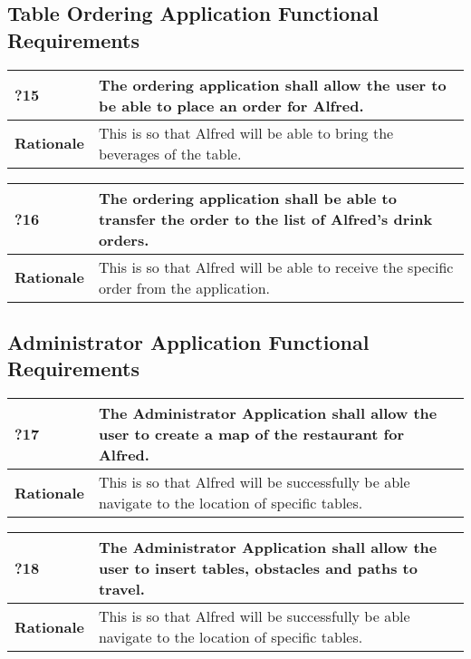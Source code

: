 \documentclass [11pt]{article}
\begin{document}
\subsection{Table Ordering Application Functional Requirements}

\begin{longtable}{| p{ } | p{ } | }\hline 
	\rowcolor{tableCell}\textbf{?15} & The ordering application shall allow the user to be able to place an order for Alfred. \\ \hline
	\textbf{Rationale} &  This is so that Alfred will be able to bring the beverages of the table.\\ \hline 
\end{longtable}


\begin{longtable}{| p{ } | p{ } | }\hline 
	\rowcolor{tableCell}\textbf{?16} & The ordering application shall be able to transfer the order to the list of Alfred's drink orders. \\ \hline
	\textbf{Rationale} &  This is so that Alfred will be able to receive the specific order from the application.\\ \hline 
\end{longtable}

\subsection{Administrator Application Functional Requirements}

\begin{longtable}{| p{ } | p{ } | }\hline 
	\rowcolor{tableCell}\textbf{?17} & The Administrator Application shall allow the user to create a map of the restaurant for Alfred. \\ \hline
	\textbf{Rationale} &  This is so that Alfred will be successfully be able navigate to the location of specific tables.\\ \hline 
\end{longtable}

\begin{longtable}{| p{ } | p{ } | }\hline 
	\rowcolor{tableCell}\textbf{?18} & The Administrator Application shall allow the user to insert tables, obstacles and paths to travel. \\ \hline
	\textbf{Rationale} &  This is so that Alfred will be successfully be able navigate to the location of specific tables.\\ \hline 
\end{longtable}
\end{document}
